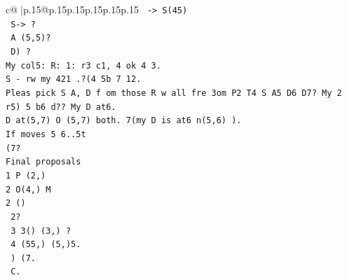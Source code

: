 \documentclass{article}
\begin{document}
{\begin{supertabular}{c@{$\;$}|p{.15\linewidth}@{}p{.15\linewidth}p{.15\linewidth}p{.15\linewidth}p{.15\linewidth}p{.15\linewidth}}
{{{\texttt{ {-}> S(45)} \\
\texttt{ S{-}> ?} \\
\texttt{ A (5,5)?} \\
\texttt{ D) ?} \\
\texttt{My col5: R: 1: r3 c1, 4 ok 4 3. } \\
\texttt{S {-} rw my 421 .?(4 5b 7 12.} \\
\texttt{Pleas pick S A, D f om those R w all fre 3om P2 T4 S A5 D6 D7? My 2 r5) 5 b6 d?? My D at6.} \\
\texttt{D at(5,7) O (5,7) both. 7(my D is at6 n(5,6) ).} \\
\texttt{If moves 5 6..5t} \\
\texttt{(7?} \\
\texttt{Final proposals} \\
\texttt{1 P (2,)} \\
\texttt{2 O(4,) M} \\
\texttt{2 ()} \\
\texttt{ 2?} \\
\texttt{ 3 3() (3,)  ?} \\
\texttt{ 4 (55,)    (5,)5.} \\
\texttt{   ) (7.} \\
\texttt{ C.} \\
            }
        }
    }
     \\ \\


\end{supertabular}}
\end{document}
